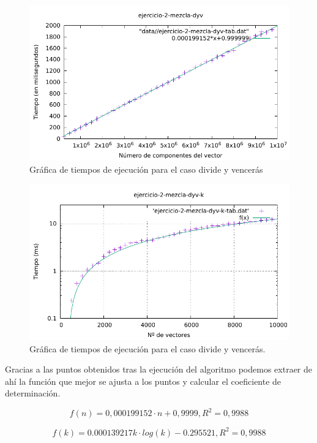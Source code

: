 \begin{figure}[h]
    \centering
    \includegraphics[scale=0.76]{img/e2-dyv-n.pdf}
    \caption{Gráfica de tiempos de ejecución para el caso divide y vencerás}
\end{figure}


\begin{figure}[h]
    \centering
    \includegraphics[scale=0.76]{img/e2-dyv-k.pdf}
    \caption{Gráfica de tiempos de ejecución para el caso divide y vencerás.}
\end{figure}

Gracias a las puntos obtenidos tras la ejecución del algoritmo podemos extraer de ahí 
la función que mejor se ajusta a los puntos y calcular el coeficiente de determinación.

\begin{equation}
    \boxed{f(n) = 0,000199152 \cdot n + 0,9999, R^2 = 0,9988}
    \label{eq:2b-ajuste-n}
\end{equation}

\begin{equation}
    \boxed{f(k) = 0.000139217 k \cdot log(k) - 0.295521, R^2 = 0,9988}
    \label{eq:2b-ajuste-k}
\end{equation}

